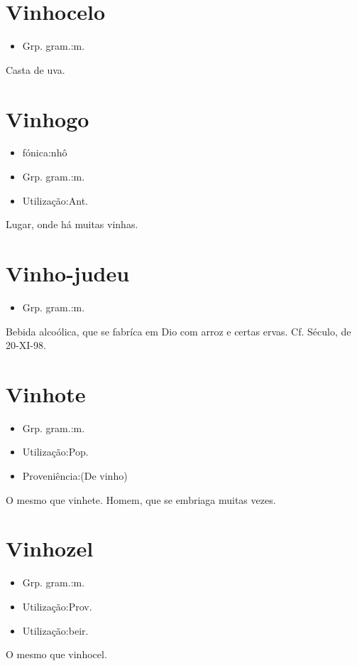 \documentclass{article}
\begin{document}
\section{Vinhocelo}
\begin{itemize}
\item {Grp. gram.:m.}
\end{itemize}
Casta de uva.
\section{Vinhogo}
\begin{itemize}
\item {fónica:nhô}
\end{itemize}
\begin{itemize}
\item {Grp. gram.:m.}
\end{itemize}
\begin{itemize}
\item {Utilização:Ant.}
\end{itemize}
Lugar, onde há muitas vinhas.
\section{Vinho-judeu}
\begin{itemize}
\item {Grp. gram.:m.}
\end{itemize}
Bebida alcoólica, que se fabríca em Dio com arroz e certas ervas. Cf. \textunderscore Século\textunderscore , de 20-XI-98.
\section{Vinhote}
\begin{itemize}
\item {Grp. gram.:m.}
\end{itemize}
\begin{itemize}
\item {Utilização:Pop.}
\end{itemize}
\begin{itemize}
\item {Proveniência:(De \textunderscore vinho\textunderscore )}
\end{itemize}
O mesmo que \textunderscore vinhete\textunderscore .
Homem, que se embriaga muitas vezes.
\section{Vinhozel}
\begin{itemize}
\item {Grp. gram.:m.}
\end{itemize}
\begin{itemize}
\item {Utilização:Prov.}
\end{itemize}
\begin{itemize}
\item {Utilização:beir.}
\end{itemize}
O mesmo que \textunderscore vinhocel\textunderscore .
\end{document}
